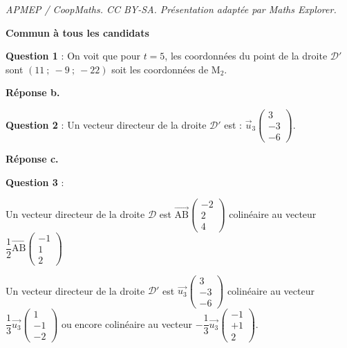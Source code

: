 \documentclass[10pt]{article}
\providecommand{\vect}[1]{\overrightarrow{#1}}
\begin{document}
\noindent\textit{APMEP / CoopMaths. CC BY-SA. Présentation adaptée par Maths Explorer.}\par\medskip
\textbf{Commun à tous les candidats}

\medskip



























\textbf{Question 1} : 
On voit que pour $t = 5$, les coordonnées du point de la droite $\mathcal{D}'$ sont $(11~;~- 9~;~- 22)$ soit les coordonnées de M$_2$.

\smallskip

\hfill\textbf{Réponse b.}

\medskip

\textbf{Question 2} : Un vecteur directeur de la droite $\mathcal{D}'$ est : $\vect{u}_3\begin{pmatrix}3\\- 3\\-6\end{pmatrix}$.

\smallskip

\hfill\textbf{Réponse c.}

\medskip



\textbf{Question 3} : 






Un vecteur directeur de la droite $\mathcal{D}$ est $\vect{\text{AB}}\begin{pmatrix}-2\\2\\4\end{pmatrix}$ colinéaire au vecteur $\dfrac{1}{2}\vect{\text{AB}}\begin{pmatrix}-1\\1\\2\end{pmatrix}$

Un vecteur directeur de la droite $\mathcal{D}'$ est $\vect{u_3}\begin{pmatrix}3\\- 3\\-6\end{pmatrix}$ colinéaire au vecteur $\dfrac{1}{3}\vect{u_3}\begin{pmatrix}1\\- 1\\-2\end{pmatrix}$ ou encore colinéaire au vecteur $-\dfrac{1}{3}\vect{u_3}\begin{pmatrix}-1\\+ 1\\2\end{pmatrix}$.
\end{document}
